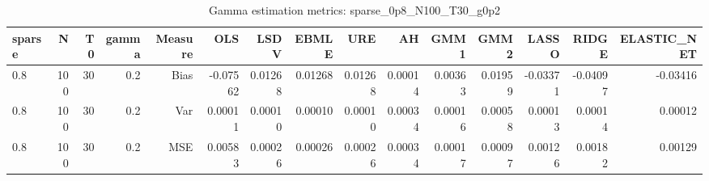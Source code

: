 \begin{table}[!htbp]\centering
\caption{Gamma estimation metrics: sparse_0p8_N100_T30_g0p2}
\label{tab:table1_sparse_0p8_N100_T30_g0p2}
\begin{tabular}{lrrrrrrrrrrrrrr}
\hline
sparse & N & T0 & gamma & Measure & OLS & LSDV & EBMLE & URE & AH & GMM1 & GMM2 & LASSO & RIDGE & ELASTIC_NET \\
\hline
0.8 & 100 & 30 & 0.2 & Bias & -0.07562 & 0.01268 & 0.01268 & 0.01268 & 0.00014 & 0.00363 & 0.01959 & -0.03371 & -0.04097 & -0.03416 \\
0.8 & 100 & 30 & 0.2 & Var & 0.00011 & 0.00010 & 0.00010 & 0.00010 & 0.00034 & 0.00016 & 0.00058 & 0.00013 & 0.00014 & 0.00012 \\
0.8 & 100 & 30 & 0.2 & MSE & 0.00583 & 0.00026 & 0.00026 & 0.00026 & 0.00034 & 0.00017 & 0.00097 & 0.00126 & 0.00182 & 0.00129 \\
\hline
\end{tabular}
\end{table}

